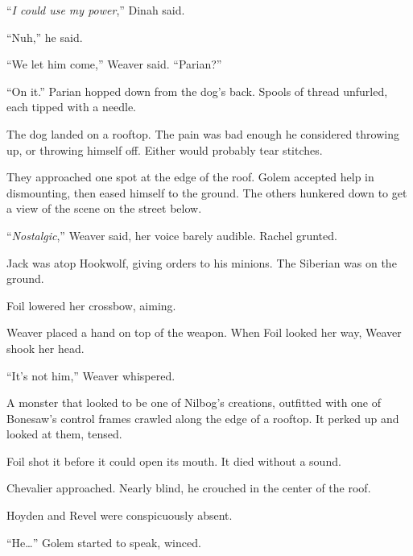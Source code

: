``\emph{I could use my power},'' Dinah said.



``Nuh,'' he said.



``We let him come,'' Weaver said.  ``Parian?''



``On it.''  Parian hopped down from the dog's back.  Spools of thread unfurled, each tipped with a needle.



\sectionbreak



The dog landed on a rooftop.  The pain was bad enough he considered throwing up, or throwing himself off.  Either would probably tear stitches.



They approached one spot at the edge of the roof.  Golem accepted help in dismounting, then eased himself to the ground.  The others hunkered down to get a view of the scene on the street below.



``\emph{Nostalgic},'' Weaver said, her voice barely audible.  Rachel grunted.



Jack was atop Hookwolf, giving orders to his minions.  The Siberian was on the ground.



Foil lowered her crossbow, aiming.



Weaver placed a hand on top of the weapon.  When Foil looked her way, Weaver shook her head.



``It's not him,'' Weaver whispered.



A monster that looked to be one of Nilbog's creations, outfitted with one of Bonesaw's control frames crawled along the edge of a rooftop.  It perked up and looked at them, tensed.



Foil shot it before it could open its mouth.  It died without a sound.



Chevalier approached.  Nearly blind, he crouched in the center of the roof.



Hoyden and Revel were conspicuously absent.



``He\ldots'' Golem started to speak, winced.



